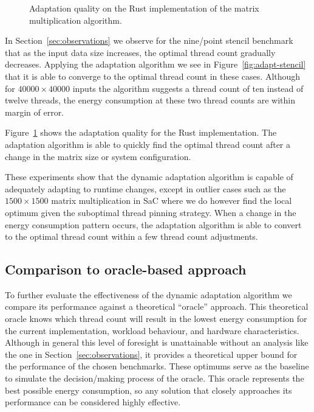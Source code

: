 \begin{figure}[ht]
  \scriptsize
  \captionsetup{width=.45\linewidth}
  \begin{minipage}{0.50\linewidth}
    \centering
    \caption{Adaptation quality on the SaC implementation of the nine-point stencil operation.}%
    \label{fig:adapt-stencil}
  \end{minipage}%
  \begin{minipage}{0.50\linewidth}
    \centering
    \caption{Adaptation quality on the Rust implementation of the matrix multiplication algorithm.}%
    \label{fig:adapt-rust}
  \end{minipage}%
\end{figure}

In Section~\ref{sec:observations} we observe for the nine\-/point stencil benchmark that as the input data size increases, the optimal thread count gradually decreases.
Applying the adaptation algorithm we see in Figure~\ref{fig:adapt-stencil} that it is able to converge to the optimal thread count in these cases.
Although for $40000 \times 40000$ inputs the algorithm suggests a thread count of ten instead of twelve threads, the energy consumption at these two thread counts are within margin of error.

Figure~\ref{fig:adapt-rust} shows the adaptation quality for the Rust implementation.
The adaptation algorithm is able to quickly find the optimal thread count after a change in the matrix size or system configuration.

These experiments show that the dynamic adaptation algorithm is capable of adequately adapting to runtime changes, except in outlier cases such as the $1500 \times 1500$ matrix multiplication in SaC where we do however find the local optimum given the suboptimal thread pinning strategy.
When a change in the energy consumption pattern occurs, the adaptation algorithm is able to convert to the optimal thread count within a few thread count adjustments.

\subsection{Comparison to oracle-based approach}\label{sec:evaluation-oracle}
To further evaluate the effectiveness of the dynamic adaptation algorithm we compare its performance
against a theoretical ``oracle'' approach.
This theoretical oracle knows which thread count will
result in the lowest energy consumption for the current implementation, workload behaviour, and
hardware characteristics.
Although in general this level of foresight is unattainable without an
analysis like the one in Section~\ref{sec:observations}, it provides a theoretical upper bound for
the performance of the chosen benchmarks.
These optimums serve as the baseline to simulate the
decision\-/making process of the oracle.
This oracle represents the best possible energy consumption,
so any solution that closely approaches its performance can be considered highly effective.


